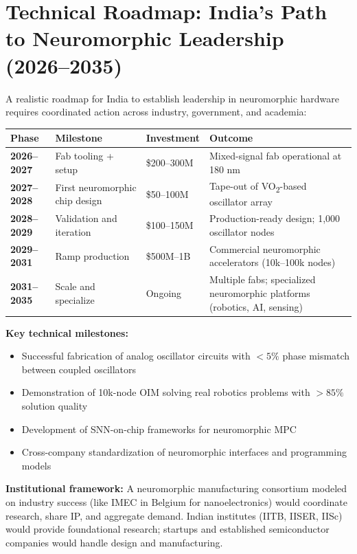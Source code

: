 \section{Technical Roadmap: India's Path to Neuromorphic Leadership (2026--2035)}

A realistic roadmap for India to establish leadership in neuromorphic hardware requires coordinated action across industry, government, and academia:

\begin{center}
\begin{tabular}{llll}
\toprule
\textbf{Phase} & \textbf{Milestone} & \textbf{Investment} & \textbf{Outcome} \\ \midrule
\textbf{2026--2027} & Fab tooling + setup & \$200--300M & Mixed-signal fab operational at 180 nm \\
\textbf{2027--2028} & First neuromorphic chip design & \$50--100M & Tape-out of VO\textsubscript{2}-based oscillator array \\
\textbf{2028--2029} & Validation and iteration & \$100--150M & Production-ready design; 1,000 oscillator nodes \\
\textbf{2029--2031} & Ramp production & \$500M--1B & Commercial neuromorphic accelerators (10k--100k nodes) \\
\textbf{2031--2035} & Scale and specialize & Ongoing & Multiple fabs; specialized neuromorphic platforms (robotics, AI, sensing) \\
\bottomrule
\end{tabular}
\end{center}

\textbf{Key technical milestones:}
\begin{itemize}
\item Successful fabrication of analog oscillator circuits with $< 5\%$ phase mismatch between coupled oscillators
\item Demonstration of 10k-node OIM solving real robotics problems with $> 85\%$ solution quality
\item Development of SNN-on-chip frameworks for neuromorphic MPC
\item Cross-company standardization of neuromorphic interfaces and programming models
\end{itemize}

\textbf{Institutional framework:}
A neuromorphic manufacturing consortium modeled on industry success (like IMEC in Belgium for nanoelectronics) would coordinate research, share IP, and aggregate demand. Indian institutes (IITB, IISER, IISc) would provide foundational research; startups and established semiconductor companies would handle design and manufacturing.

